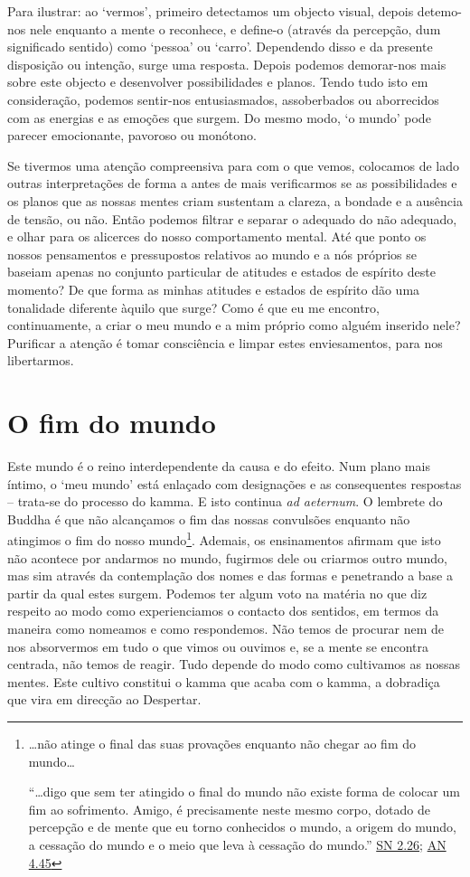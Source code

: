 Para ilustrar: ao `vermos', primeiro detectamos um objecto visual, depois detemo-nos nele enquanto a mente o reconhece, e define-o (através da percepção, dum significado sentido) como `pessoa' ou `carro'. Dependendo disso e da presente disposição ou intenção, surge uma resposta. Depois podemos demorar-nos mais sobre este objecto e desenvolver possibilidades e planos. Tendo tudo isto em consideração, podemos sentir-nos entusiasmados, assoberbados ou aborrecidos com as energias e as emoções que surgem. Do mesmo modo, `o mundo' pode parecer emocionante, pavoroso ou monótono.

Se tivermos uma atenção compreensiva para com o que vemos, colocamos de lado outras interpretações de forma a antes de mais verificarmos se as possibilidades e os planos que as nossas mentes criam sustentam a clareza, a bondade e a ausência de tensão, ou não. Então podemos filtrar e separar o adequado do não adequado, e olhar para os alicerces do nosso comportamento mental. Até que ponto os nossos pensamentos e pressupostos relativos ao mundo e a nós próprios se baseiam apenas no conjunto particular de atitudes e estados de espírito deste momento? De que forma as minhas atitudes e estados de espírito dão uma tonalidade diferente àquilo que surge? Como é que eu me encontro, continuamente, a criar o meu mundo e a mim próprio como alguém inserido nele? Purificar a atenção é tomar consciência e limpar estes enviesamentos, para nos libertarmos.

\section{O fim do mundo}

Este mundo é o reino interdependente da causa e do efeito. Num plano mais íntimo, o `meu mundo' está enlaçado com designações e as consequentes respostas -- trata-se do processo do kamma. E isto continua \emph{ad aeternum}. O lembrete do Buddha é que não alcançamos o fim das nossas convulsões enquanto não atingimos o fim do nosso mundo\footnote{\ldots não atinge o final das suas provações enquanto não chegar ao fim do mundo\ldots{}

  ``\ldots digo que sem ter atingido o final do mundo não existe forma de colocar um fim ao sofrimento. Amigo, é precisamente neste mesmo corpo, dotado de percepção e de mente que eu torno conhecidos o mundo, a origem do mundo, a cessação do mundo e o meio que leva à cessação do mundo.'' \href{https://suttacentral.net/sn2.26/en/sujato}{SN 2.26}; \href{https://suttacentral.net/an4.45/en/thanissaro}{AN 4.45}}. Ademais, os ensinamentos afirmam que isto não acontece por andarmos no mundo, fugirmos dele ou criarmos outro mundo, mas sim através da contemplação dos nomes e das formas e penetrando a base a partir da qual estes surgem. Podemos ter algum voto na matéria no que diz respeito ao modo como experienciamos o contacto dos sentidos, em termos da maneira como nomeamos e como respondemos. Não temos de procurar nem de nos absorvermos em tudo o que vimos ou ouvimos e, se a mente se encontra centrada, não temos de reagir. Tudo depende do modo como cultivamos as nossas mentes. Este cultivo constitui o kamma que acaba com o kamma, a dobradiça que vira em direcção ao Despertar.

